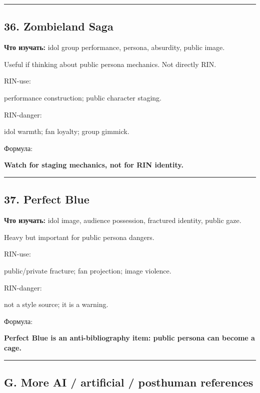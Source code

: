 \begin{center}\rule{0.5\linewidth}{0.5pt}\end{center}

\subsection*{36. Zombieland Saga}

\textbf{Что изучать:} idol group performance, persona, absurdity, public
image.

Useful if thinking about public persona mechanics. Not directly RIN.

RIN-use:

performance construction; public character staging.

RIN-danger:

idol warmth; fan loyalty; group gimmick.

Формула:

\textbf{Watch for staging mechanics, not for RIN identity.}

\begin{center}\rule{0.5\linewidth}{0.5pt}\end{center}

\subsection*{37. Perfect Blue}

\textbf{Что изучать:} idol image, audience possession, fractured
identity, public gaze.

Heavy but important for public persona dangers.

RIN-use:

public/\hspace{0pt}private fracture; fan projection; image violence.

RIN-danger:

not a style source; it is a warning.

Формула:

\textbf{Perfect Blue is an anti-bibliography item: public persona can
become a cage.}

\begin{center}\rule{0.5\linewidth}{0.5pt}\end{center}

\subsection*{G. More AI /\hspace{0pt} artificial /\hspace{0pt} posthuman references}

